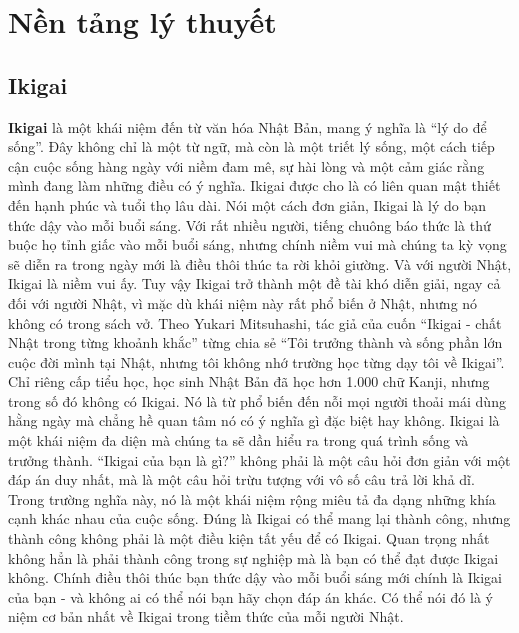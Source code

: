 \section{Nền tảng lý thuyết}
\subsection{Ikigai}
\textbf{Ikigai} là một khái niệm đến từ văn hóa Nhật Bản, mang ý nghĩa là “lý do để sống”. Đây không chỉ là một từ ngữ, mà còn là một triết lý sống, một cách tiếp cận cuộc sống hàng ngày với niềm đam mê, sự hài lòng và một cảm giác rằng mình đang làm những điều có ý nghĩa. Ikigai được cho là có liên quan mật thiết đến hạnh phúc và tuổi thọ lâu dài. Nói một cách đơn giản, Ikigai là lý do bạn thức dậy vào mỗi buổi sáng. Với rất nhiều người, tiếng chuông báo thức là thứ buộc họ tỉnh giấc vào mỗi buổi sáng, nhưng chính niềm vui mà chúng ta kỳ vọng sẽ diễn ra trong ngày mới là điều thôi thúc ta rời khỏi giường. Và với người Nhật, Ikigai là niềm vui ấy. Tuy vậy Ikigai trở thành một đề tài khó diễn giải, ngay cả đối với người Nhật, vì mặc dù khái niệm này rất phổ biến ở Nhật, nhưng nó không có trong sách vở. Theo Yukari Mitsuhashi, tác giả của cuốn “Ikigai - chất Nhật trong từng khoảnh khắc” từng chia sẻ “Tôi trưởng thành và sống phần lớn cuộc đời mình tại Nhật, nhưng tôi không nhớ trường học từng dạy tôi về Ikigai”. Chỉ riêng cấp tiểu học, học sinh Nhật Bản đã học hơn 1.000 chữ Kanji, nhưng trong số đó không có Ikigai. Nó là từ phổ biến đến nỗi mọi người thoải mái dùng hằng ngày mà chẳng hề quan tâm nó có ý nghĩa gì đặc biệt hay không. Ikigai là một khái niệm đa diện mà chúng ta sẽ dần hiểu ra trong quá trình sống và trưởng thành. “Ikigai của bạn là gì?” không phải là một câu hỏi đơn giản với một đáp án duy nhất, mà là một câu hỏi trừu tượng với vô số câu trả lời khả dĩ. Trong trường nghĩa này, nó là một khái niệm rộng miêu tả đa dạng những khía cạnh khác nhau của cuộc sống.
Đúng là Ikigai có thể mang lại thành công, nhưng thành công không phải là một điều kiện tất yếu để có Ikigai.
Quan trọng nhất không hẳn là phải thành công trong sự nghiệp mà là bạn có thể đạt được Ikigai không.
Chính điều thôi thúc bạn thức dậy vào mỗi buổi sáng mới chính là Ikigai của bạn - và không ai có thể nói bạn hãy chọn đáp án khác.
Có thể nói đó là ý niệm cơ bản nhất về Ikigai trong tiềm thức của mỗi người Nhật.

